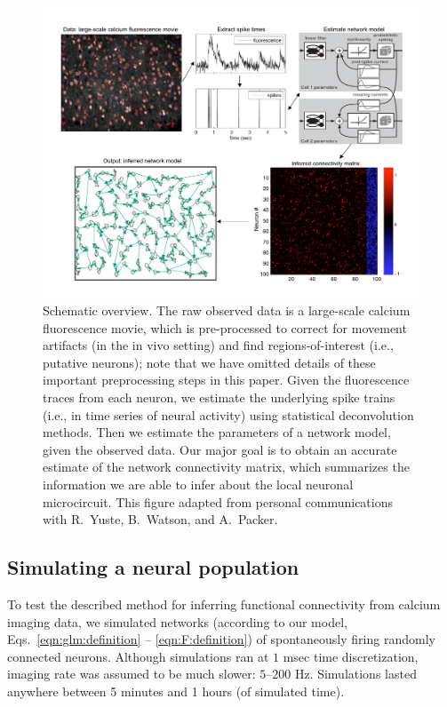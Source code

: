 \documentclass[aoas,preprint]{imsart}
\begin{document}
\begin{figure}[t!] 
	\centering 
	\includegraphics[width=\hsize]{../figs/yuri-paper-schematic} 
	\caption{Schematic overview. The raw observed data is a large-scale calcium fluorescence movie, which is pre-processed to correct for movement artifacts (in the in vivo setting) and find regions-of-interest (i.e., putative neurons); note that we have omitted details of these important preprocessing steps in this paper. Given the fluorescence traces from each neuron, we estimate the underlying spike trains (i.e., in time series of neural activity) using statistical deconvolution methods. Then we estimate the parameters of a network model, given the observed data. Our major goal is to obtain an accurate estimate of the network connectivity matrix, which summarizes the information we are able to infer about the local neuronal microcircuit. This figure adapted from personal communications with R.\ Yuste, B.\ Watson, and A.\ Packer.} 
	\label{fig:data_schematic} 
\end{figure}

\subsection{Simulating a neural population} \label{sec:results:simulations}

To test the described method for inferring functional connectivity from calcium imaging data, we simulated networks (according to our model, Eqs.~\eqref{eqn:glm:definition} -- \eqref{eqn:F:definition}) of spontaneously firing randomly connected neurons. Although simulations ran at $1$ msec time discretization, imaging rate was assumed to be much slower: $5$--$200$ Hz. Simulations lasted anywhere between 5 minutes and 1 hours (of simulated time). 
\end{document}
